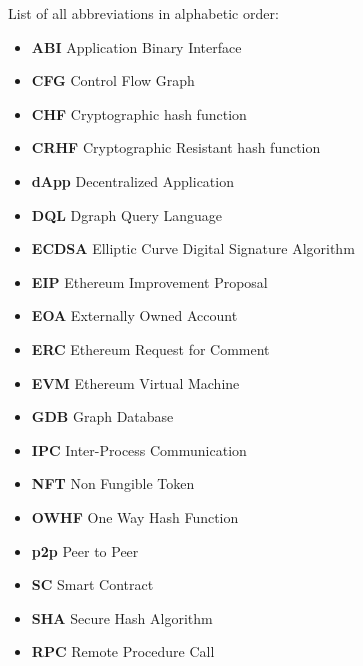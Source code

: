 
List of all abbreviations in alphabetic order:

\begin{itemize}
    \item \textbf{ABI} Application Binary Interface
    \item \textbf{CFG} Control Flow Graph
    \item \textbf{CHF} Cryptographic hash function
    \item \textbf{CRHF} Cryptographic Resistant hash function
    \item \textbf{dApp} Decentralized Application
    \item \textbf{DQL} Dgraph Query Language
    \item \textbf{ECDSA} Elliptic Curve Digital Signature Algorithm
    \item \textbf{EIP} Ethereum Improvement Proposal
    \item \textbf{EOA} Externally Owned Account
    \item \textbf{ERC} Ethereum Request for Comment
    \item \textbf{EVM} Ethereum Virtual Machine
    \item \textbf{GDB} Graph Database
    \item \textbf{IPC} Inter-Process Communication
    \item \textbf{NFT} Non Fungible Token
    \item \textbf{OWHF} One Way Hash Function
    \item \textbf{p2p} Peer to Peer
    \item \textbf{SC} Smart Contract
    \item \textbf{SHA} Secure Hash Algorithm
    \item \textbf{RPC} Remote Procedure Call
\end{itemize}